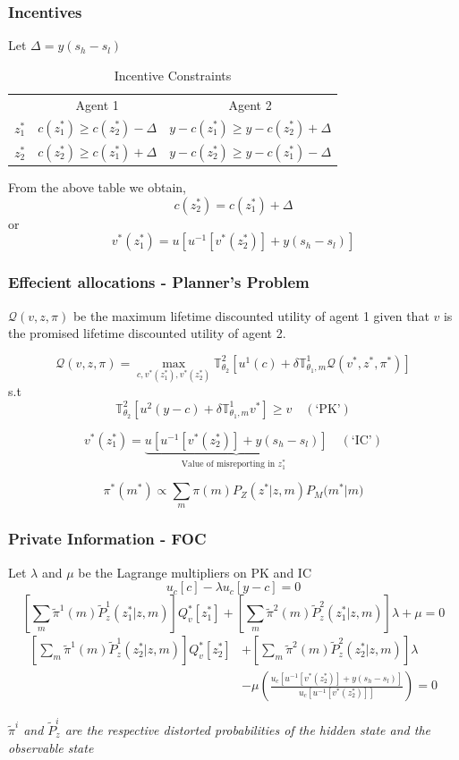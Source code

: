 \documentclass{beamer}
\theoremstyle{definition}
\begin{document}
\begin{frame}
\frametitle{Incentives}
Let $\Delta=y(s_h-s_l)$ 
\begin{table}[h]
  \centering
  \begin{tabular}[h]{l c c}
    
& Agent 1 & Agent 2 \\
$z^*_1$ & $c(z^*_1)\geq c(z^*_2)-\Delta$ & $y-c(z^*_1)\geq y-c(z^*_2)+\Delta$  \\
$z^*_2$ & $c(z^*_2)\geq c(z^*_1)+\Delta$ & $y-c(z^*_2)\geq y-c(z^*_1)-\Delta$  \\
 
  \end{tabular}
  \caption{Incentive Constraints}
  
\end{table}


From the above table we obtain,
\[c(z^*_2)=c(z^*_1)+\Delta\]
or 
\[v^*(z^*_1) = u[u^{-1} \left[v^*(z^*_2)\right] +
  y(s_h-s_l)] \]


\end{frame}


\begin{frame}
\frametitle{Effecient allocations - Planner's Problem}


$\mathcal{Q}(v,z,\pi)$ be the maximum lifetime discounted utility of agent 1 given that $v$ is the promised lifetime discounted utility of agent 2.

\[\mathcal{Q}(v,z,\pi)=\max_{c,v^*(z^*_1),v^*(z^*_2)  } \mathbb{T}_{\theta_2}^{2}\left[u^1(c)+\delta \mathbb{T}_{\theta_1,m}^{1} \mathcal{Q}(v^*,z^*,\pi^*)\right]\]
s.t
\[\mathbb{T}_{\theta_2}^2\left[u^2(y-c)+\delta
  \mathbb{T}_{\theta_1,m}^{1} v^*\right]\geq v \quad (\text{`PK'})\] 

\[v^*(z^*_1) = \underbrace{u[u^{-1} \left[v^*(z^*_2)\right] +
  y(s_h-s_l)]}_{\text{Value of misreporting in $z^*_1$ }}  \quad (\text{`IC'})\]

\[\pi^{*}(m^*)\propto \sum_{m}{\pi(m) P_Z(z^*|z,m)P_M(m^*}|m)\]
\end{frame}



\begin{frame}
\frametitle{Private Information - FOC}
Let $\lambda$ and $\mu$ be the Lagrange multipliers on PK and IC
\[u_c[c]-\lambda u_c[y-c]=0\]
\[\left[\sum_{m}{\tilde{\pi}^1(m)\tilde{P}^1_z(z^*_1 | z,m)}\right]
Q^*_v [z^*_1] +\left[\sum_{m}{\tilde{\pi}^2(m)\tilde{P}^2_z(z^*_1 |
    z,m)}\right]  \lambda  + \mu =0\]
\begin{align*}
\left[\sum_{m}{\tilde{\pi}^1(m)\tilde{P}^1_z(z^*_2 | z,m)}\right]
Q^*_v [z^*_2] &+ \left[\sum_{m}{\tilde{\pi}^2(m)\tilde{P}^2_z(z^*_2 |
    z,m)}\right]  \lambda\\
& -\mu\left( \frac{u_c[u^{-1} \left[v^*(z^*_2)\right]+ 
    y(s_h-s_l)]}{u_c[u^{-1} \left[v^*(z^*_2)\right]]}\right)=0
\end{align*}

\emph{$\tilde{\pi}^i $ and $\tilde {P}^i_z$ are the respective
  distorted probabilities of the hidden state and the observable state}
\end{frame}
\end{document}
